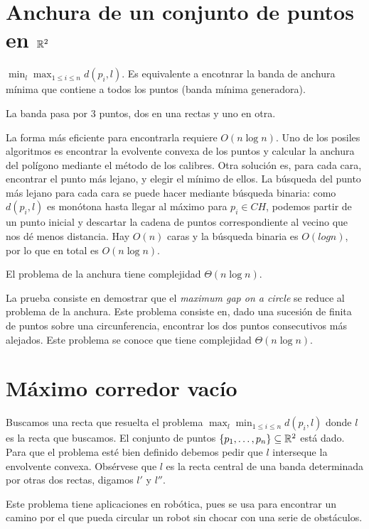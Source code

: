 \documentclass[TGyGC.tex]{subfiles}
\begin{document}
\section{Anchura de un conjunto de puntos en $\mathbb{R}^2$}
$\min_l\max_{1\leq i\leq n}d(p_i,l)$. Es equivalente a encotnrar la banda de anchura mínima que contiene a todos los puntos (banda mínima generadora). 

\begin{prop}
La banda pasa por 3 puntos, dos en una rectas y uno en otra. 
\end{prop}
La forma más eficiente para encontrarla requiere $O(n\log n)$. Uno de los posiles algoritmos es encontrar la evolvente convexa de los puntos y calcular la anchura del polígono mediante el método de los calibres. Otra solución es, para cada cara, encontrar el punto más lejano, y elegir el mínimo de ellos. La búsqueda del punto más lejano para cada cara se puede hacer mediante búsqueda binaria: como $d(p_i,l)$ es monótona hasta llegar al máximo para $p_i\in CH$, podemos partir de un punto inicial y descartar la cadena de puntos correspondiente al vecino que nos dé menos distancia. Hay $O(n)$ caras y la búsqueda binaria es $O(log n)$, por lo que en total es $O(n\log n)$.

\begin{teorema}
El problema de la anchura tiene complejidad $\Theta(n\log n)$.
\end{teorema}
La prueba consiste en demostrar que el \emph{maximum gap on a circle} se reduce al problema de la anchura. Este problema consiste en, dado una sucesión de finita de puntos sobre una circunferencia, encontrar los dos puntos consecutivos más alejados. Este problema se conoce que tiene complejidad $\Theta(n\log n)$. 

\section{Máximo corredor vacío}
Buscamos una recta que resuelta el problema $\max_{l}\min_{1\leq i\leq n} d(p_i,l)$ donde $l$ es la recta que buscamos. El conjunto de puntos $\{p_1,\dots, p_n\}\subseteq\mathbb{R}^2$ está dado. Para que el problema esté bien definido debemos pedir que $l$ interseque la envolvente convexa. Obsérvese que $l$ es la recta central de una banda determinada por otras dos rectas, digamos $l'$ y $l''$.

Este problema tiene aplicaciones en robótica, pues se usa para encontrar un camino por el que pueda circular un robot sin chocar con una serie de obstáculos.
\end{document}
